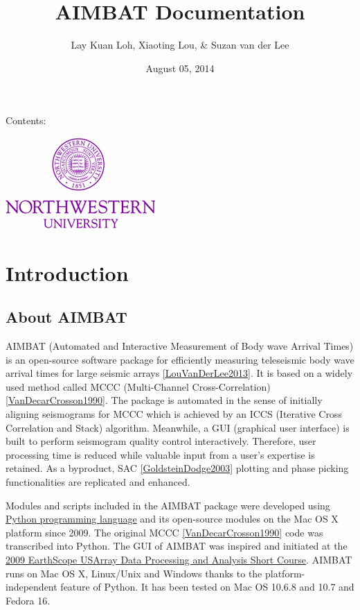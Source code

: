 \documentclass[letterpaper,10pt,english]{sphinxmanual}
\title{AIMBAT Documentation}
\date{August 05, 2014}
\author{Lay Kuan Loh, Xiaoting Lou, \& Suzan van der Lee}
\begin{document}
\maketitle
\tableofcontents
{}\label{index::doc}


Contents:

\includegraphics{NU_Logo_purple.jpg}


\chapter{Introduction}
\label{docfiles/introduction:introduction}\label{docfiles/introduction:welcome-to-aimbat-s-documentation}\label{docfiles/introduction::doc}

\section{About AIMBAT}
\label{docfiles/introduction:about-aimbat}
AIMBAT (Automated and Interactive Measurement of Body wave Arrival Times) is an open-source software package for efficiently measuring teleseismic body wave arrival times for large seismic arrays {\hyperref[docfiles/citations:louvanderlee2013]{{[}LouVanDerLee2013{]}}}. It is based on a widely used method called MCCC (Multi-Channel Cross-Correlation) {\hyperref[docfiles/citations:vandecarcrosson1990]{{[}VanDecarCrosson1990{]}}}. The package is automated in the sense of initially aligning seismograms for MCCC which is achieved by an ICCS (Iterative Cross Correlation and Stack) algorithm. Meanwhile, a GUI (graphical user interface) is built to perform seismogram quality control interactively. Therefore, user processing time is reduced while valuable input from a user's expertise is retained. As a byproduct, SAC {\hyperref[docfiles/citations:goldsteindodge2003]{{[}GoldsteinDodge2003{]}}} plotting and phase picking functionalities are replicated and enhanced.

Modules and scripts included in the AIMBAT package were developed using \href{http://www.python.org/}{Python programming language} and its open-source modules on the Mac OS X platform since 2009. The original MCCC {\hyperref[docfiles/citations:vandecarcrosson1990]{{[}VanDecarCrosson1990{]}}} code was transcribed into Python. The GUI of AIMBAT was inspired and initiated at the \href{http://www.iris.edu/hq/es\_course/content/2009.html}{2009 EarthScope USArray Data Processing and Analysis Short Course}. AIMBAT runs on Mac OS X, Linux/Unix and Windows thanks to the platform-independent feature of Python. It has been tested on Mac OS 10.6.8 and 10.7 and Fedora 16.
\end{document}
